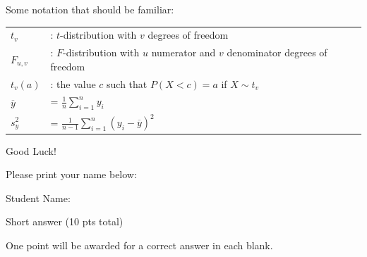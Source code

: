 \documentclass[10pt,draft]{article}
\newcommand{\smallbrk}{\vspace*{.3in}}
\begin{document}
Some notation that should be familiar:
\begin{center}
\begin{tabular}{ll}
$t_v$ &: $t$-distribution with $v$ degrees of freedom \\
$F_{u,v}$ &: $F$-distribution with $u$ numerator and $v$ denominator degrees of freedom \\
$t_{v}(a)$ &: the value $c$ such that $P(X<c)=a$ if $X\sim t_v$ \\
$\overline{y}$ &= $\frac{1}{n} \sum_{i=1}^n y_i$ \\
$s_y^2$ &= $\frac{1}{n-1} \sum_{i=1}^n (y_i-\overline{y})^2$ \\
\end{tabular}
\end{center}

\smallbrk

Good Luck!

\smallbrk

Please print your name below:

\smallbrk


Student Name: \underline{\phantom{XXXXXXXXXXXXXXXXXXXXXXXXXXXXXXXXXXXXXXXXX}}  

\newpage

\noindent \begin{Large}Short answer (10 pts total) \end{Large}

\bigskip

One point will be awarded for a correct answer in each blank. 

\bigskip
\end{document}
